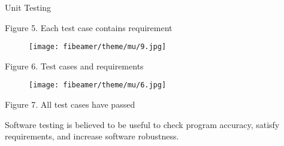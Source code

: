 \documentclass[final]{beamer}
\newlength{\onecolwid}
\newlength{\twocolwid}
\begin{document}
\begin{frame}
\begin{columns}[t]
\begin{column}{\twocolwid}
\begin{columns}[t,totalwidth=\twocolwid]
\begin{column}{\onecolwid}
\begin{exampleblock}{Unit Testing}
\begin{itemize}
            Figure 5. Each test case contains requirement 
    
  \begin{figure}
\texttt{[image: fibeamer/theme/mu/9.jpg]}
\end{figure}

            Figure 6. Test cases and requirements 
            

  \begin{figure}
\texttt{[image: fibeamer/theme/mu/6.jpg]}
\end{figure}

          
                 
            Figure 7. All test cases have passed
              
              
         {\small       
         \item     Software testing is believed to be useful to check program accuracy, satisfy requirements, and increase software robustness.
}
              \end{itemize}
\end{exampleblock}



\end{column} %

\end{columns} %



\begin{columns}[t,totalwidth=\twocolwid] %

\begin{column}{\onecolwid} %





\end{column}
\end{columns}
\end{column}
\end{columns}
\end{frame}
\end{document}

